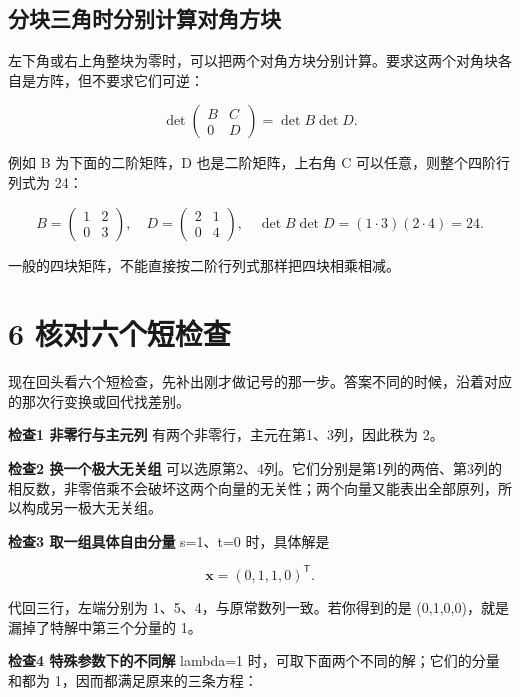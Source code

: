 \documentclass[
  11pt,
  a4paper,
  fontset=fandol]{ctexart}
\begin{document}

\subsection{分块三角时分别计算对角方块}\label{ux5206ux5757ux4e09ux89d2ux65f6ux5206ux522bux8ba1ux7b97ux5bf9ux89d2ux65b9ux5757}

左下角或右上角整块为零时，可以把两个对角方块分别计算。要求这两个对角块各自是方阵，但不要求它们可逆：

\[\det\begin{pmatrix}B&C\\0&D\end{pmatrix}=\det B\det D.\]

例如 B 为下面的二阶矩阵，D 也是二阶矩阵，上右角 C
可以任意，则整个四阶行列式为 24：

\[B=\begin{pmatrix}1&2\\0&3\end{pmatrix},\quad
D=\begin{pmatrix}2&1\\0&4\end{pmatrix},\quad
\det B\det D=(1\cdot3)(2\cdot4)=24.\]

一般的四块矩阵，不能直接按二阶行列式那样把四块相乘相减。


\section{6
核对六个短检查}\label{6-ux6838ux5bf9ux516dux4e2aux77edux68c0ux67e5}

现在回头看六个短检查，先补出刚才做记号的那一步。答案不同的时候，沿着对应的那次行变换或回代找差别。

\textbf{检查1 非零行与主元列} 有两个非零行，主元在第1、3列，因此秩为 2。

\textbf{检查2 换一个极大无关组}
可以选原第2、4列。它们分别是第1列的两倍、第3列的相反数，非零倍乘不会破坏这两个向量的无关性；两个向量又能表出全部原列，所以构成另一极大无关组。

\textbf{检查3 取一组具体自由分量} s=1、t=0 时，具体解是

\[\boldsymbol x=(0,1,1,0)^{\mathsf T}.\]

代回三行，左端分别为 1、5、4，与原常数列一致。若你得到的是
(0,1,0,0)，就是漏掉了特解中第三个分量的 1。

\textbf{检查4 特殊参数下的不同解} lambda=1
时，可取下面两个不同的解；它们的分量和都为 1，因而都满足原来的三条方程：
\end{document}
